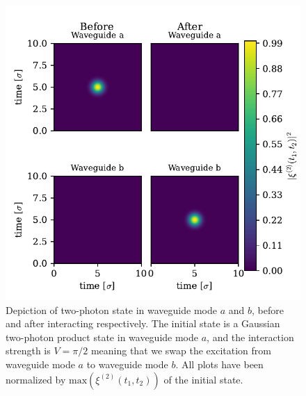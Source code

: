 \begin{figure}[H]
    \centering
    \includegraphics[width=0.6 \linewidth]{figures/swapping_twophoton.pdf}
    \caption{Depiction of two-photon state in waveguide mode $a$ and $b$, before and after interacting respectively. The initial state is a Gaussian two-photon product state in waveguide mode $a$, and the interaction strength is $V=\pi/2$ meaning that we swap the excitation from waveguide mode $a$ to waveguide mode $b$. All plots have been normalized by $\mathrm{max}(\xi^{(2)}(t_1,t_2))$ of the initial state.}
    \label{fig:swapping_twophoton}
\end{figure}

